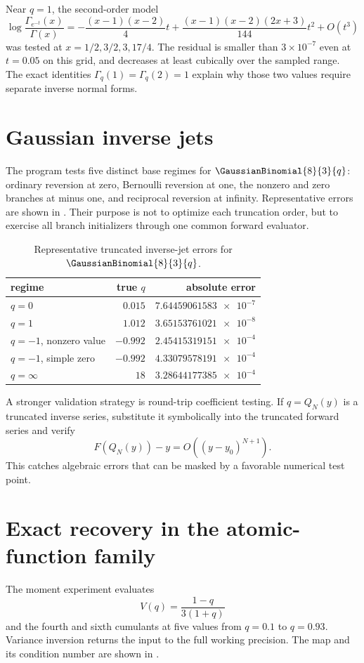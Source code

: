 \documentclass[11pt,letterpaper,oneside,openany]{book}
\theoremstyle{definition}
\theoremstyle{remark}
\begin{document}
Near \(q=1\), the second-order model
\[
 \log\frac{\Gamma_{e^{-t}}(x)}{\Gamma(x)}
 =-\frac{(x-1)(x-2)}4t
 +\frac{(x-1)(x-2)(2x+3)}{144}t^2+O(t^3)
\]
was tested at \(x=1/2,3/2,3,17/4\).  The residual is smaller than
\(3\times10^{-7}\) even at \(t=0.05\) on this grid, and decreases at least
cubically over the sampled range.  The exact identities
\(\Gamma_q(1)=\Gamma_q(2)=1\) explain why those two values require separate
inverse normal forms.

\section{Gaussian inverse jets}
The program tests five distinct base regimes for \(\GaussianBinomial{8}{3}{q}\): ordinary
reversion at zero, Bernoulli reversion at one, the nonzero and zero branches at
minus one, and reciprocal reversion at infinity.  Representative errors are
shown in .  Their purpose is not to optimize each
truncation order, but to exercise all branch initializers through one common
forward evaluator.

\begin{table}[H]
\centering
\caption{Representative truncated inverse-jet errors for \(\GaussianBinomial{8}{3}{q}\).}
\label{tab:gaussian-jet-errors}
\begin{tabular}{@{}lrr@{}}
\toprule
regime & true \(q\) & absolute error\\
\midrule
\(q=0\) & \(0.015\) & \(\num{7.64459061583e-7}\)\\
\(q=1\) & \(1.012\) & \(\num{3.65153761021e-8}\)\\
\(q=-1\), nonzero value & \(-0.992\) & \(\num{2.45415319151e-4}\)\\
\(q=-1\), simple zero & \(-0.992\) & \(\num{4.33079578191e-4}\)\\
\(q=\infty\) & \(18\) & \(\num{3.28644177385e-4}\)\\
\bottomrule
\end{tabular}
\end{table}

A stronger validation strategy is round-trip coefficient testing.  If
\(q=Q_N(y)\) is a truncated inverse series, substitute it symbolically into the
truncated forward series and verify
\[
 F(Q_N(y))-y=O((y-y_0)^{N+1}).
\]
This catches algebraic errors that can be masked by a favorable numerical test
point.

\section{Exact recovery in the atomic-function family}
The moment experiment evaluates
\[
 V(q)=\frac{1-q}{3(1+q)}
\]
and the fourth and sixth cumulants at five values from \(q=0.1\) to
\(q=0.93\).  Variance inversion returns the input to the full working
precision.  The map and its condition number are shown in
.
\end{document}
